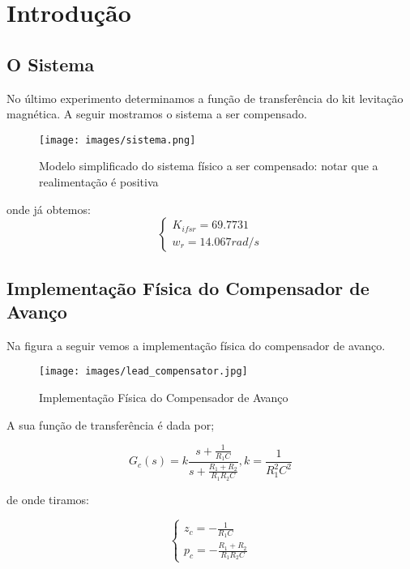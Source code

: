 \section{Introdução}

\subsection{O Sistema}
No último experimento determinamos a função de transferência do kit levitação magnética. A seguir mostramos o sistema a ser compensado.

\begin{figure}[H]
\centering
\texttt{[image: images/sistema.png]}
\caption{Modelo simplificado do sistema físico a ser compensado: notar que a realimentação é positiva}
\label{fig:avanco-fisico}
\end{figure}

onde já obtemos:
\begin{equation}
\left\{
   \begin{array}{l}
    K_{ifsr} = 69.7731\\
    w_r = 14.067 rad/s  
   \end{array}
   \right.
\end{equation}

\subsection{Implementação Física do Compensador de Avanço}
Na figura a seguir vemos a implementação física do compensador de avanço.

\begin{figure}[H]
\centering
\texttt{[image: images/lead\_compensator.jpg]}
\caption{Implementação Física do Compensador de Avanço}
\label{fig:avanco-fisico}
\end{figure}

A sua função de transferência é dada por;

\begin{equation}
    G_c(s) = k\frac{s + \frac{1}{R_1 C}}{s + \frac{R_1 + R_2}{R_1 R_2 C}}, k = \frac{1}{R_1^2C^2}
\end{equation}

de onde tiramos:

\begin{equation}
\left\{
   \begin{array}{l}
    z_c = -\frac{1}{R_1C}  \\
    p_c = -\frac{R_1 + R_2}{R_1R_2C}  
   \end{array}
   \right.
\end{equation}

